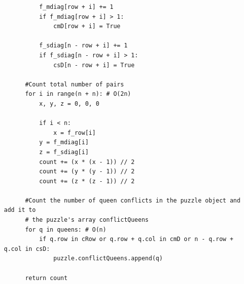 \documentclass{article}
\begin{document}
\begin{verbatim}
          f_mdiag[row + i] += 1
          if f_mdiag[row + i] > 1:
              cmD[row + i] = True
  
          f_sdiag[n - row + i] += 1
          if f_sdiag[n - row + i] > 1:
              csD[n - row + i] = True
  
      #Count total number of pairs
      for i in range(n + n): # O(2n)
          x, y, z = 0, 0, 0
  
          if i < n:
              x = f_row[i]
          y = f_mdiag[i]
          z = f_sdiag[i]  
          count += (x * (x - 1)) // 2
          count += (y * (y - 1)) // 2
          count += (z * (z - 1)) // 2
  
      #Count the number of queen conflicts in the puzzle object and add it to
      # the puzzle's array conflictQueens
      for q in queens: # O(n)
          if q.row in cRow or q.row + q.col in cmD or n - q.row + q.col in csD:
              puzzle.conflictQueens.append(q)
  
      return count
   \end{verbatim}
\newpage
\end{document}
